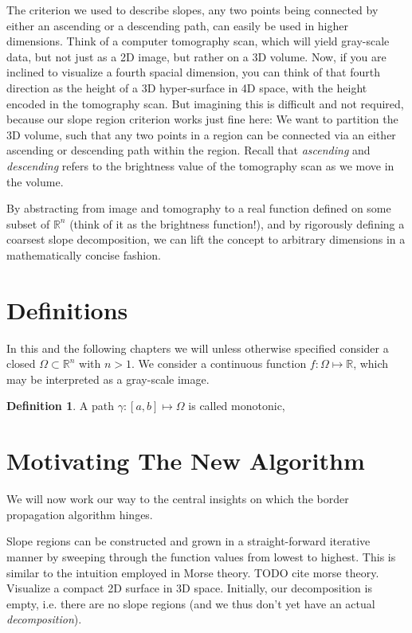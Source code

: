 \documentclass[a4paper,12pt]{paper}
\theoremstyle{plain}
\theoremstyle{definition}
\newtheorem{defn}[thm]{Definition} %
\begin{document}
The criterion we used to describe slopes, any two points being connected by either an ascending or a descending path, can easily be used in higher dimensions. Think of a computer tomography scan, which will yield gray-scale data, but not just as a 2D image, but rather on a 3D volume.
Now, if you are inclined to visualize a fourth spacial dimension, you can think of that fourth direction as the height of a 3D hyper-surface in 4D space, with the height encoded in the tomography scan. But imagining this is difficult and not required, because our slope region criterion works just fine here: We want to partition the 3D volume, such that any two points in a region can be connected via an either ascending or descending path within the region. Recall that \emph{ascending} and \emph{descending} refers to the brightness value of the tomography scan as we move in the volume.

By abstracting from image and tomography to a real function defined on some subset of $\mathbb{R}^n$ (think of it as the brightness function!), and by rigorously defining a coarsest slope decomposition, we can lift the concept to arbitrary dimensions in a mathematically concise fashion.

\section{Definitions}

In this and the following chapters we will unless otherwise specified consider a closed $\Omega \subset \mathbb{R}^n$ with $n > 1$. We consider a continuous function $f: \Omega \mapsto \mathbb{R}$, which may be interpreted as a gray-scale image.

\begin{defn}
A path $\gamma: [a,b] \mapsto \Omega$ is called monotonic, 
\end{defn}



\section{Motivating The New Algorithm}
We will now work our way to the central insights on which the border propagation algorithm hinges.

Slope regions can be constructed and grown in a straight-forward iterative manner by sweeping through the function values from lowest to highest. This is similar to the intuition employed in Morse theory. TODO cite morse theory. Visualize a compact 2D surface in 3D space. Initially, our decomposition is empty, i.e. there are no slope regions (and we thus don't yet have an actual \emph{decomposition}).
\end{document}
